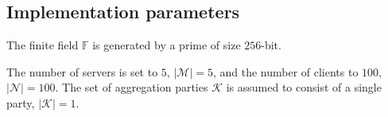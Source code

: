 



\subsection*{Implementation parameters}
The finite field $\mathds{F}$ is generated by a prime of size $256$-bit.

The number of servers is set to $5$, $|\mathcal{M}|=5$,  and the number of clients to $100$, $|\mathcal{N}|=100$.  The set of aggregation parties $\mathcal{K}$ is assumed to consist of a single party, $|\mathcal{K}|=1$.

